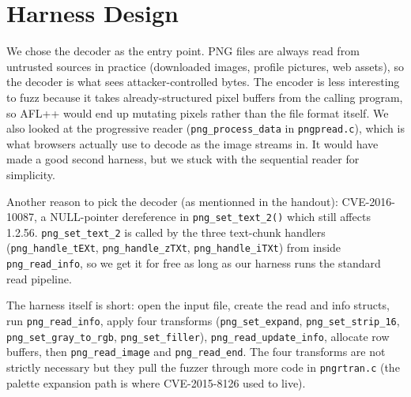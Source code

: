 \vspace{-12pt}
\section{Harness Design}
\vspace{-7pt}

We chose the decoder as the entry point. PNG files are always read
from untrusted sources in practice (downloaded images, profile
pictures, web assets), so the decoder is what sees attacker-controlled
bytes. The encoder is less interesting to fuzz because it takes
already-structured pixel buffers from the calling program, so AFL++
would end up mutating pixels rather than the file format itself. We
also looked at the progressive reader (\verb|png_process_data| in
\verb|pngpread.c|), which is what browsers actually use to decode as
the image streams in. It would have made a good second harness, but
we stuck with the sequential reader for simplicity.

Another reason to pick the decoder (as mentionned in the handout):
CVE-2016-10087, a NULL-pointer dereference in \verb|png_set_text_2()|
which still affects 1.2.56. \verb|png_set_text_2| is called by the
three text-chunk handlers (\verb|png_handle_tEXt|,
\verb|png_handle_zTXt|, \verb|png_handle_iTXt|) from inside
\verb|png_read_info|, so we get it for free as long as our harness
runs the standard read pipeline.

The harness itself is short: open the input file, create the read and
info structs, run \verb|png_read_info|, apply four transforms
(\verb|png_set_expand|, \verb|png_set_strip_16|,
\verb|png_set_gray_to_rgb|, \verb|png_set_filler|),
\verb|png_read_update_info|, allocate row buffers, then
\verb|png_read_image| and \verb|png_read_end|. The four transforms are
not strictly necessary but they pull the fuzzer through more code in
\verb|pngrtran.c| (the palette expansion path is where CVE-2015-8126
used to live).

